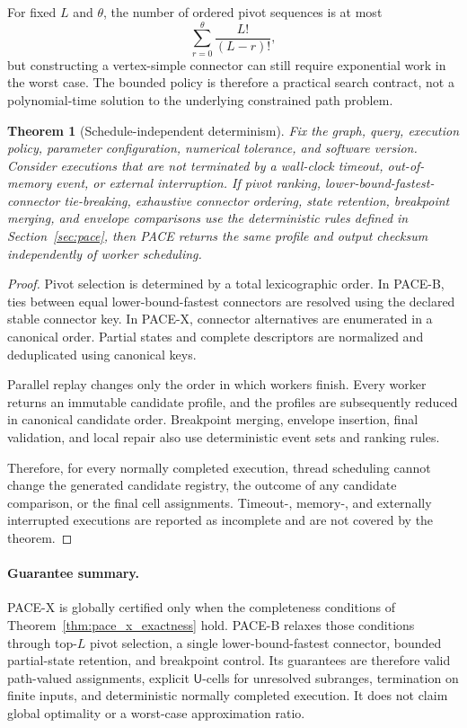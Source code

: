\documentclass[a4paper,fleqn]{cas-dc}
\newtheorem{theorem}{Theorem}
\begin{document}
For fixed \(L\) and \(\theta\), the number of ordered pivot sequences is at
most
\[
\sum_{r=0}^{\theta}\frac{L!}{(L-r)!},
\]
but constructing a vertex-simple connector can still require exponential work
in the worst case. The bounded policy is therefore a practical search contract,
not a polynomial-time solution to the underlying constrained path problem.

\begin{theorem}[Schedule-independent determinism]
\label{thm:pace_determinism}
Fix the graph, query, execution policy, parameter configuration, numerical
tolerance, and software version. Consider executions that are not terminated
by a wall-clock timeout, out-of-memory event, or external interruption. If
pivot ranking, lower-bound-fastest-connector tie-breaking, exhaustive connector ordering,
state retention, breakpoint merging, and envelope comparisons use the
deterministic rules defined in Section~\ref{sec:pace}, then PACE returns the
same profile and output checksum independently of worker scheduling.
\end{theorem}

\begin{proof}
Pivot selection is determined by a total lexicographic order. In PACE-B, ties
between equal lower-bound-fastest connectors are resolved using the declared stable connector
key. In PACE-X, connector alternatives are enumerated in a canonical order.
Partial states and complete descriptors are normalized and deduplicated using
canonical keys.

Parallel replay changes only the order in which workers finish. Every worker
returns an immutable candidate profile, and the profiles are subsequently
reduced in canonical candidate order. Breakpoint merging, envelope insertion,
final validation, and local repair also use deterministic event sets and
ranking rules.

Therefore, for every normally completed execution, thread scheduling cannot
change the generated candidate registry, the outcome of any candidate
comparison, or the final cell assignments. Timeout-, memory-, and externally
interrupted executions are reported as incomplete and are not covered by the
theorem.
\end{proof}

\paragraph{Guarantee summary.}
PACE-X is globally certified only when the completeness conditions of
Theorem~\ref{thm:pace_x_exactness} hold. PACE-B relaxes those conditions through
top-\(L\) pivot selection, a single lower-bound-fastest connector, bounded
partial-state retention, and breakpoint control. Its guarantees are therefore
valid path-valued assignments, explicit \(\mathsf U\)-cells for unresolved
subranges, termination on finite inputs, and deterministic normally completed
execution. It does not claim global optimality or a worst-case approximation
ratio.
\end{document}
